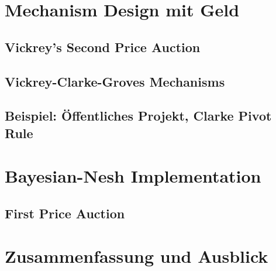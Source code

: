 \documentclass[a4paper,11pt]{article}
\theoremstyle{definition}
\theoremstyle{plain}
\theoremstyle{definition}
\begin{document}
\section{Mechanism Design mit Geld}
\subsection{Vickrey's Second Price Auction}
\subsection{Vickrey-Clarke-Groves Mechanisms}
\subsection{Beispiel: Öffentliches Projekt, Clarke Pivot Rule}

\section{Bayesian-Nesh Implementation}
\subsection{First Price Auction}

\section{Zusammenfassung und Ausblick}
~\cite{lov21}



\end{document}
